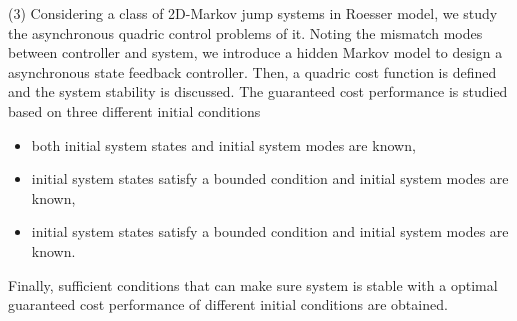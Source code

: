 \begin{eabstract}
(3) Considering a class of 2D-Markov jump systems in Roesser model, we study the asynchronous quadric control problems of it. Noting the mismatch modes between controller and system, we introduce a hidden Markov model to design a asynchronous state feedback controller. Then, a quadric cost function is defined and the system stability is discussed. The guaranteed cost performance is studied based on three different initial conditions
 
 \begin{itemize}
 	\item  both initial system states  and initial system modes are known,
 	\item  initial system states satisfy a bounded condition and initial system modes are known,
 	\item  initial system states satisfy a bounded condition and initial system modes are known.
 \end{itemize}
 Finally,  sufficient conditions that can make sure system is stable with a optimal guaranteed cost performance  of different initial conditions are obtained.


\end{eabstract}

